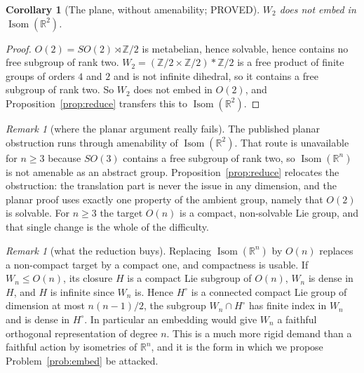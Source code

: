 \documentclass[11pt]{article}
\newtheorem{corollary}[theorem]{Corollary}
\theoremstyle{definition}
\theoremstyle{remark}
\newtheorem{remark}[theorem]{Remark}
\theoremstyle{definition}
\newcommand{\Z}{\mathbb{Z}}
\newcommand{\R}{\mathbb{R}}
\newcommand{\Isom}{\operatorname{Isom}}
\begin{document}
\begin{corollary}[The plane, without amenability; PROVED]\label{cor:plane}
$W_2$ does not embed in $\Isom(\R^2)$.
\end{corollary}

\begin{proof}
$O(2)=SO(2)\rtimes\Z/2$ is metabelian, hence solvable, hence contains no free subgroup of rank
two. $W_2=(\Z/2\times\Z/2)\ast\Z/2$ is a free product of finite groups of orders $4$ and $2$ and
is not infinite dihedral, so it contains a free subgroup of rank two. So $W_2$ does not embed in
$O(2)$, and Proposition~\ref{prop:reduce} transfers this to $\Isom(\R^2)$.
\end{proof}

\begin{remark}[where the planar argument really fails]\label{rem:wherefails}
The published planar obstruction runs through amenability of $\Isom(\R^2)$. That route is
unavailable for $n\ge3$ because $SO(3)$ contains a free subgroup of rank two, so $\Isom(\R^n)$
is not amenable as an abstract group. Proposition~\ref{prop:reduce} relocates the obstruction:
the translation part is never the issue in any dimension, and the planar proof uses exactly one
property of the ambient group, namely that $O(2)$ is solvable. For $n\ge3$ the target $O(n)$ is a
compact, non-solvable Lie group, and that single change is the whole of the difficulty.
\end{remark}

\begin{remark}[what the reduction buys]\label{rem:buys}
Replacing $\Isom(\R^n)$ by $O(n)$ replaces a non-compact target by a compact one, and compactness
is usable. If $W_n\le O(n)$, its closure $H$ is a compact Lie subgroup of $O(n)$, $W_n$ is dense
in $H$, and $H$ is infinite since $W_n$ is. Hence $H^\circ$ is a connected compact Lie group of
dimension at most $n(n-1)/2$, the subgroup $W_n\cap H^\circ$ has finite index in $W_n$ and is
dense in $H^\circ$. In particular an embedding would give $W_n$ a faithful orthogonal
representation of degree $n$. This is a much more rigid demand than a faithful action by
isometries of $\R^n$, and it is the form in which we propose Problem~\ref{prob:embed} be attacked.
\end{remark}
\end{document}
